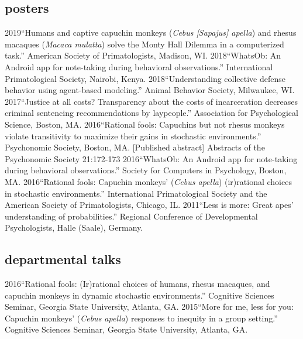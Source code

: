 \documentclass[]{friggeri-cv}
\begin{document}

\subsection{posters}

\begin{entrylist2}
  \entrytwo
    {2019}{``Humans and captive capuchin monkeys (\emph{Cebus [Sapajus] apella}) and rhesus macaques (\emph{Macaca mulatta}) solve the Monty Hall Dilemma in a computerized task.'' American Society of Primatologists, Madison, WI.}
  \entrytwo
    {2018}{``WhatsOb: An Android app for note-taking during behavioral observations.'' International Primatological Society, Nairobi, Kenya.}
  \entrytwo
    {2018}{``Understanding collective defense behavior using agent-based modeling.'' Animal Behavior Society, Milwaukee, WI.}
  \entrytwo
    {2017}{``Justice at all costs? Transparency about the costs of incarceration decreases criminal sentencing recommendations by laypeople.'' Association for Psychological Science, Boston, MA.}
\entrytwo
    {2016}{``Rational fools: Capuchins but not rhesus monkeys violate transitivity to maximize their gains in stochastic environments.'' Psychonomic Society, Boston, MA. [Published abstract] Abstracts of the Psychonomic Society 21:172-173}
  \entrytwo
    {2016}{``WhatsOb: An Android app for note-taking during behavioral observations.'' Society for Computers in Psychology, Boston, MA.}
  \entrytwo
    {2016}{``Rational fools: Capuchin monkeys' (\emph{Cebus apella}) (ir)rational choices in stochastic environments.'' International Primatological Society and the American Society of Primatologists, Chicago, IL.}
  \entrytwo
    {2011}{``Less is more: Great apes' understanding of probabilities.'' Regional Conference of Developmental Psychologists, Halle (Saale), Germany.}
\end{entrylist2}




\subsection{departmental talks}

\begin{entrylist2}
  \entrytwo
    {2016}{``Rational fools: (Ir)rational choices of humans, rhesus macaques, and capuchin monkeys in dynamic stochastic environments.'' Cognitive Sciences Seminar, Georgia State University, Atlanta, GA.}
  \entrytwo
    {2015}{``More for me, less for you: Capuchin monkeys' (\emph{Cebus apella}) responses to inequity in a group setting.'' Cognitive Sciences Seminar, Georgia State University, Atlanta, GA.}
\end{entrylist2}
\end{document}
